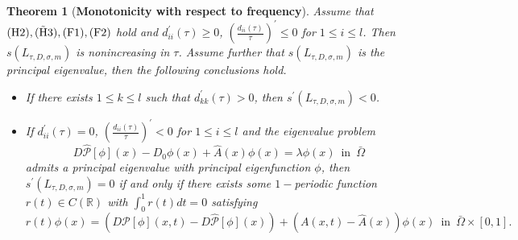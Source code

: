 \documentclass[11pt,reqno]{amsart}
\newtheorem{theorem}{Theorem}[section]
\numberwithin{equation}{section}
\begin{document}
\begin{theorem}[\textbf{Monotonicity with respect to frequency}]\label{THM1.9}
Assume that ${\rm (H2),(\tilde{H}3), (F1), (F2)}$ hold and $d_{ii}^{\prime}(\tau)\geq 0$, $ \left(\frac{d_{ii}(\tau)}{\tau} \right)^{\prime} \leq 0$ for  $1\leq i \leq l$.
Then $s(L_{\tau,D,\sigma,m})$ is nonincreasing in $\tau$.
Assume further that $s(L_{\tau,D,\sigma,m})$ is the principal eigenvalue, then the following conclusions hold.
\begin{itemize}[leftmargin=0.8cm]

\item[$(i)$] If there exists $1 \leq k\leq l$ such that $d_{kk}^{\prime}(\tau)> 0$, then $s^{\prime}(L_{\tau,D,\sigma,m})<0$.

\item[$(ii)$]
If $d_{ii}^{\prime}(\tau)=0$, $\left( \frac{d_{ii}(\tau)}{\tau} \right)^{\prime}<0$ for $1\leq i \leq l$ and the eigenvalue problem
\begin{equation*}
D \hat{\mathcal{P}}[\phi](x) - D_{0}\phi(x) + \hat{A}(x)\phi(x) = \lambda \phi(x)
\enspace \text{in} \enspace \bar{\Omega}
\end{equation*}
admits a principal eigenvalue with principal eigenfunction $\phi$, then $s^{\prime}(L_{\tau,D,\sigma,m}) = 0$ if and only if there exists some $1-$periodic function $r(t)\in C(\mathbb{R})$ with $\int_{0}^{1}r(t)dt=0$ satisfying
\begin{equation*}
r(t)\phi(x) = \left( D \mathcal{P}[\phi](x,t) - D\hat{\mathcal{P}}[\phi](x) \right) +   \left(A(x,t) - \hat{A}(x) \right)\phi(x)
\enspace  \text{in} \enspace \bar{\Omega}\times[0,1].
\end{equation*}
\end{itemize}
\end{theorem}
\end{document}
